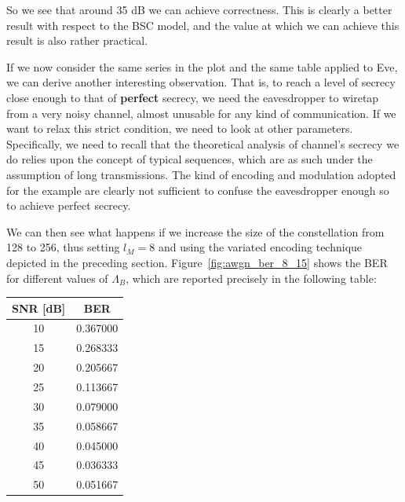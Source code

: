 \documentclass[a4paper,12pt,titlepage]{article}
\begin{document}
So we see that around 35 dB we can achieve correctness. This is clearly a
better result with respect to the BSC model, and the value at which we can
achieve this result is also rather practical.

If we now consider the same series in the plot and the same table applied to
Eve, we can derive another interesting observation. That is, to reach a level
of secrecy close enough to that of \textbf{perfect} secrecy, we need the
eavesdropper to wiretap from a very noisy channel, almost unusable for any kind
of communication. If we want to relax this strict condition, we need to look at
other parameters. Specifically, we need to recall that the theoretical analysis
of channel's secrecy we do relies upon the concept of typical sequences, which
are as such under the assumption of long transmissions. The kind of encoding
and modulation adopted for the example are clearly not sufficient to confuse
the eavesdropper enough so to achieve perfect secrecy.

We can then see what happens if we increase the size of the constellation from
128 to 256, thus setting $l_M = 8$ and using the variated encoding technique
depicted in the preceding section.
Figure~\ref{fig:awgn_ber_8_15} shows the BER for different values of $\Lambda_B$,
which are reported precisely in the following table:

\begin{tabular}{ | c | c | }
  \hline
  \textbf{SNR [dB]} & \textbf{BER} \\
  \hline
  10 & 0.367000 \\
  15 & 0.268333 \\
  20 & 0.205667 \\
  25 & 0.113667 \\
  30 & 0.079000 \\
  35 & 0.058667 \\
  40 & 0.045000 \\
  45 & 0.036333 \\
  50 & 0.051667 \\
  \hline
\end{tabular}
\end{document}
